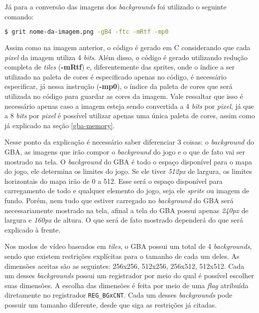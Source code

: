 Já para a conversão das imagens dos \textit{backgrounds} foi utilizado o seguinte comando:

\begin{lstlisting}[language=bash,caption={Comando para conversão dos \textit{backgrounds} em código}]
$ grit nome-da-imagem.png -gB4 -ftc -mRtf -mp0
\end{lstlisting}

Assim como na imagem anterior, o código é gerado em C considerando que cada \textit{pixel} da imagem utiliza 4 \textit{bits}. Além disso, o código é gerado utilizando redução completa de \textit{tiles} (\textbf{-mRtf}) e, diferentemente das sprites, onde o índice a ser utilizado na paleta de cores é especificado apenas no código, é necessário especificar, já nessa instrução (\textbf{-mp0}), o índice da paleta de cores que será utilizada no código para guardar as cores da imagem. Vale ressaltar que isso é necessário apenas caso a imagem esteja sendo convertida a 4 \textit{bits} por \textit{pixel}, já que a 8 \textit{bits} por \textit{pixel} é possível utilizar apenas uma única paleta de cores, assim como já explicado na seção \ref{gba-memory}.

Nesse ponto da explicação é necessário saber diferenciar 3 coisas: o \textit{background} do GBA, as imagens que irão compor o \textit{background} do jogo e o que de fato vai ser mostrado na tela. O \textit{background} do GBA é todo o espaço disponível para o mapa do jogo, ele determina os limites do jogo. Se ele tiver \textit{512px} de largura, os limites horizontais do mapa irão de 0 a 512. Esse será o espaço disponível para carregamento de todo e qualquer elemento do jogo, seja ele \textit{sprite} ou imagem de fundo. Porém, nem tudo que estiver carregado no \textit{background} do GBA será necessariamente mostrado na tela, afinal a tela do GBA possui apenas \textit{240px} de largura e \textit{160px} de altura. O que será de fato mostrado dependerá do que será explicado à frente.

Nos modos de vídeo baseados em \textit{tiles}, o GBA possui um total de 4 \textit{backgrounds}, sendo que existem restrições explícitas para o tamanho de cada um deles. As dimensões aceitas são as seguintes: 256x256, 512x256, 256x512, 512x512. Cada um desses \textit{backgrounds} possui um registrador por meio do qual é possível escolher suas dimensões. A escolha das dimensões é feita por meio de uma \textit{flag} atribuída diretamente no registrador \texttt{REG\_BGxCNT}. Cada um desses \textit{backgrounds} pode possuir um tamanho diferente, desde que siga as restrições já citadas.

